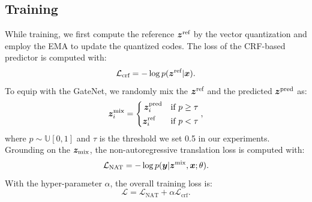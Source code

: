 \subsection{Training}
While training, we first compute the reference $\bm z^\text{ref}$ by the vector quantization and employ the EMA to update the quantized codes.
The loss of the CRF-based predictor is computed with:
\begin{equation}
    \mathcal{L}_\text{crf} = -\operatorname{log} p(\bm z^\text{ref}|\bm x).
\end{equation}
To equip with the GateNet, we randomly mix the $\bm z^\text{ref}$ and the predicted $\bm z^\text{pred}$ as:
\begin{equation}
    \bm z_i^\text{mix}=\left\{
\begin{aligned}
\bm z_i^\text{pred} &\quad \text{if}\ p \geq \tau \\
\bm z_i^\text{ref\ \ \ } &\quad \text{if}\ p < \tau 
\end{aligned}
\right.,
\label{eqn:mix}
\end{equation}
where $p\sim \mathbb{U}[0,1]$ and $\tau$ is the threshold we set 0.5 in our experiments. 
Grounding on the $\bm z_\text{mix}$, the non-autoregressive translation loss is computed with: %
\begin{equation}
    \mathcal{L}_\text{NAT} =  -\operatorname{log} p(\bm y|\bm z^\text{mix},\bm x;\theta).
\end{equation}
With the hyper-parameter $\alpha$, the overall training loss is:
\begin{equation}
    \mathcal{L} = \mathcal{L}_\text{NAT} + \alpha\mathcal{L}_\text{crf}.
    \label{eqn:loss}
\end{equation}




